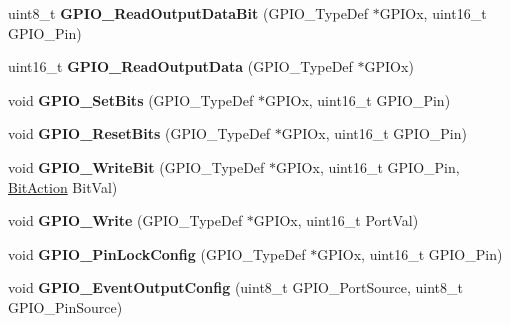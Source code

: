 \begin{DoxyCompactItemize}
\item 
\hypertarget{group__GPIO__Exported__Functions_ga138270f8695b105b7c6ed405792919c1}{
uint8\_\-t {\bfseries GPIO\_\-ReadOutputDataBit} (GPIO\_\-TypeDef $\ast$GPIOx, uint16\_\-t GPIO\_\-Pin)}
\label{group__GPIO__Exported__Functions_ga138270f8695b105b7c6ed405792919c1}

\item 
\hypertarget{group__GPIO__Exported__Functions_gaf8938a34280b7dc3e39872a7c17bb323}{
uint16\_\-t {\bfseries GPIO\_\-ReadOutputData} (GPIO\_\-TypeDef $\ast$GPIOx)}
\label{group__GPIO__Exported__Functions_gaf8938a34280b7dc3e39872a7c17bb323}

\item 
\hypertarget{group__GPIO__Exported__Functions_ga9e1352eed7c6620e18af2d86f6b6ff8e}{
void {\bfseries GPIO\_\-SetBits} (GPIO\_\-TypeDef $\ast$GPIOx, uint16\_\-t GPIO\_\-Pin)}
\label{group__GPIO__Exported__Functions_ga9e1352eed7c6620e18af2d86f6b6ff8e}

\item 
\hypertarget{group__GPIO__Exported__Functions_ga6fcd35b207a66608dd2c9d7de9247dc8}{
void {\bfseries GPIO\_\-ResetBits} (GPIO\_\-TypeDef $\ast$GPIOx, uint16\_\-t GPIO\_\-Pin)}
\label{group__GPIO__Exported__Functions_ga6fcd35b207a66608dd2c9d7de9247dc8}

\item 
\hypertarget{group__GPIO__Exported__Functions_ga8f7b237fd744d9f7456fbe0da47a9b80}{
void {\bfseries GPIO\_\-WriteBit} (GPIO\_\-TypeDef $\ast$GPIOx, uint16\_\-t GPIO\_\-Pin, \hyperlink{group__GPIO__Exported__Types_ga176130b21c0e719121470a6042d4cf19}{BitAction} BitVal)}
\label{group__GPIO__Exported__Functions_ga8f7b237fd744d9f7456fbe0da47a9b80}

\item 
\hypertarget{group__GPIO__Exported__Functions_gaa925f19c8547a00c7a0c269a84873bf9}{
void {\bfseries GPIO\_\-Write} (GPIO\_\-TypeDef $\ast$GPIOx, uint16\_\-t PortVal)}
\label{group__GPIO__Exported__Functions_gaa925f19c8547a00c7a0c269a84873bf9}

\item 
\hypertarget{group__GPIO__Exported__Functions_gad2f2e615928c69fd0d8c641a7cedaafc}{
void {\bfseries GPIO\_\-PinLockConfig} (GPIO\_\-TypeDef $\ast$GPIOx, uint16\_\-t GPIO\_\-Pin)}
\label{group__GPIO__Exported__Functions_gad2f2e615928c69fd0d8c641a7cedaafc}

\item 
\hypertarget{group__GPIO__Exported__Functions_ga935f31ed7a86c6cb594cf34313b4b7af}{
void {\bfseries GPIO\_\-EventOutputConfig} (uint8\_\-t GPIO\_\-PortSource, uint8\_\-t GPIO\_\-PinSource)}
\label{group__GPIO__Exported__Functions_ga935f31ed7a86c6cb594cf34313b4b7af}


\end{DoxyCompactItemize}
